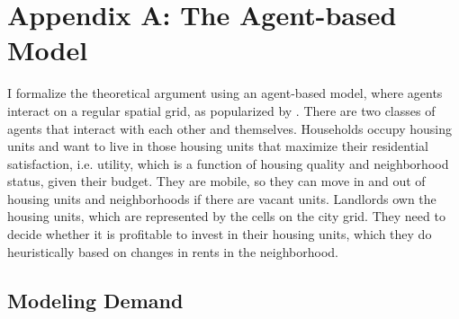 \documentclass[a4paper,12pt]{article}
\begin{document}



\section*{Appendix A: The Agent-based Model}

I formalize the theoretical argument using an agent-based model, where agents interact on a regular spatial grid, as popularized by \citet{schellingDynamicModelsSegregation1971}. There are two classes of agents that interact with each other and themselves. Households occupy housing units and want to live in those housing units that maximize their residential satisfaction, i.e. utility, which is a function of housing quality and neighborhood status, given their budget. They are mobile, so they can move in and out of housing units and neighborhoods if there are vacant units. Landlords own the housing units, which are represented by the cells on the city grid. They need to decide whether it is profitable to invest in their housing units, which they do heuristically based on changes in rents in the neighborhood.

\subsection*{Modeling Demand}
\end{document}
